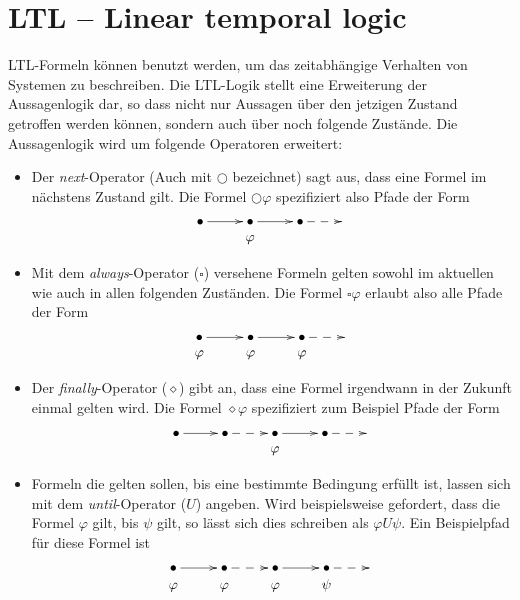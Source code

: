 \section{LTL -- Linear temporal logic}
LTL-Formeln können benutzt werden, um das zeitabhängige Verhalten von Systemen zu beschreiben\cite{ltlbasics}.
Die LTL-Logik stellt eine Erweiterung der Aussagenlogik dar, so dass nicht nur Aussagen über den jetzigen Zustand getroffen werden können, sondern auch über noch folgende Zustände.
Die Aussagenlogik wird um folgende Operatoren erweitert:
\begin{itemize}
\item Der \emph{next}-Operator (Auch mit $\bigcirc$ bezeichnet) sagt aus, dass eine Formel im nächstens Zustand gilt.
  Die Formel $\bigcirc\varphi$ spezifiziert also Pfade der Form
  \[ \xymatrix @R=0em {
      \bullet \ar[r] & \bullet \ar[r] & \bullet \ar@{-->}[r] &\\
      & \varphi & &
  }
    \]
\item Mit dem \emph{always}-Operator ($\square$) versehene Formeln gelten sowohl im aktuellen wie auch in allen folgenden Zuständen.
  Die Formel $\square\varphi$ erlaubt also alle Pfade der Form
  \[ \xymatrix @R=0em {
      \bullet \ar[r] & \bullet \ar[r] & \bullet \ar@{-->}[r] &\\
      \varphi & \varphi & \varphi &
  }
    \]
\item Der \emph{finally}-Operator ($\diamond$) gibt an, dass eine Formel irgendwann in der Zukunft einmal gelten wird.
  Die Formel $\diamond\varphi$ spezifiziert zum Beispiel Pfade der Form
  \[ \xymatrix @R=0em {
    \bullet \ar[r] & \bullet \ar@{-->}[r] & \bullet \ar[r] & \bullet \ar@{-->}[r] & \\
    & & \varphi & &
  } \]
\item Formeln die gelten sollen, bis eine bestimmte Bedingung erfüllt ist, lassen sich mit dem \emph{until}-Operator ($U$) angeben.
  Wird beispielsweise gefordert, dass die Formel $\varphi$ gilt, bis $\psi$ gilt, so lässt sich dies schreiben als $\varphi U\psi$.
  Ein Beispielpfad für diese Formel ist
  \[ \xymatrix @R=0em {
    \bullet \ar[r] & \bullet \ar@{-->}[r] & \bullet \ar[r] & \bullet \ar@{-->}[r] & \\
    \varphi & \varphi & \varphi & \psi &
  } \]
\end{itemize}
